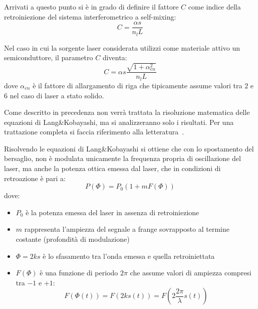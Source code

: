 Arrivati a questo punto si è in grado di definire il fattore $C$ come indice della retroiniezione del sistema interferometrico a self-mixing:
\begin{equation}
	C = \frac{\alpha s}{n_l L}
\end{equation}

Nel caso in cui la sorgente laser considerata utilizzi come materiale attivo un semiconduttore, il parametro $C$ diventa:
\begin{equation}
	C=\alpha s \frac{\sqrt{1+\alpha_{en}^2}}{n_l L}
\end{equation}
dove $\alpha_{en}$ è il fattore di allargamento di riga che tipicamente assume valori tra $2$ e $6$ nel caso di laser a stato solido.

Come descritto in precedenza non verrà trattata la risoluzione matematica delle equazioni di Lang\&Kobayashi, ma si analizzeranno solo i risultati. Per una trattazione completa si faccia riferimento alla letteratura~\cite{1070479}.

Risolvendo le equazioni di Lang\&Kobayashi si ottiene che con lo spostamento del bersaglio, non è modulata unicamente la frequenza propria di oscillazione del laser, ma anche la potenza ottica emessa dal laser, che in condizioni di retroazione è pari a:
\begin{equation}
	P(\Phi)=P_0(1+mF(\Phi))
\end{equation}
dove:
\begin{itemize}
	\item $P_0$ è la potenza emessa del laser in assenza di retroiniezione 
	\item $m$ rappresenta l'ampiezza del segnale a frange sovrapposto al termine costante (profondità di modulazione)
	\item $\Phi = 2ks$ è lo sfasamento tra l'onda emessa e quella retroiniettata 
	\item $F(\Phi)$ è una funzione di periodo $2\pi$ che assume valori di ampiezza compresi tra $-1$ e $+1$:
		\begin{equation}
			F(\Phi(t))=F(2ks(t))=F(2\frac{2\pi}{\lambda}s(t))
		\end{equation}
\end{itemize}

